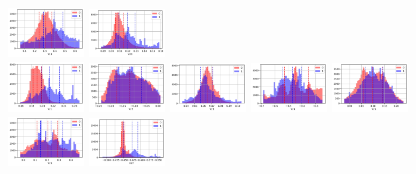 \documentclass[11pt]{article}
\begin{document}
\begin{figure}[H]
  \includegraphics[width=0.18\textwidth]{../code/Task3/Analysis/Hist-V19.jpg}
  \includegraphics[width=0.18\textwidth]{../code/Task3/Analysis/Hist-V20.jpg} \\
  \includegraphics[width=0.18\textwidth]{../code/Task3/Analysis/Hist-V21.jpg}
  \includegraphics[width=0.18\textwidth]{../code/Task3/Analysis/Hist-V22.jpg}
  \includegraphics[width=0.18\textwidth]{../code/Task3/Analysis/Hist-V23.jpg}
  \includegraphics[width=0.18\textwidth]{../code/Task3/Analysis/Hist-V24.jpg}
  \includegraphics[width=0.18\textwidth]{../code/Task3/Analysis/Hist-V25.jpg} \\
  \includegraphics[width=0.18\textwidth]{../code/Task3/Analysis/Hist-V26.jpg}
  \includegraphics[width=0.18\textwidth]{../code/Task3/Analysis/Hist-V27.jpg}

\end{figure}
\end{document}
